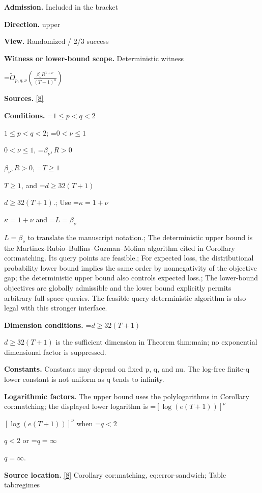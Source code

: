 \documentclass[10pt,a4paper]{article}
\newcommand{\AtlasMath}[1]{\par\begingroup\centering\setbox0=\hbox{$\displaystyle #1$}\ifdim\wd0>1.4\linewidth\typeout{ATLAS WIDE FORMULA: \the\wd0}\fi\ifdim\wd0>\linewidth\resizebox{\linewidth}{!}{\box0}\else\box0\fi\par\endgroup}
\newcommand{\AtlasInlineMath}[1]{\begingroup\setbox0=\hbox{$#1$}\ifdim\wd0>.4\linewidth\endgroup\AtlasMath{#1}\else\endgroup$#1$\fi}
\begin{document}
\textbf{Admission.} Included in the bracket



\textbf{Direction.} upper



\textbf{View.} Randomized / 2/3 success



\textbf{Witness or lower-bound scope.} Deterministic witness



\AtlasMath{\widetilde O_{p,q,\nu}\!\left(\frac{\beta_\nu R^{1+\nu}}{(T+1)^a}\right)}


\textbf{Sources.} \href{https://github.com/WU-Wendao/Colombo/blob/main/colombo_sensorium/Complexity_altas/data/sources/colombo/B1/manuscript.pdf}{[8]}



\textbf{Conditions.} \AtlasInlineMath{1\le p<q<2}; \AtlasInlineMath{0<\nu\le1}, \AtlasInlineMath{\beta_\nu,R>0}, \AtlasInlineMath{T\ge1}, and \AtlasInlineMath{d\ge32(T+1)}.; Use \AtlasInlineMath{\kappa=1+\nu} and \AtlasInlineMath{L=\beta_\nu} to translate the manuscript notation.; The deterministic upper bound is the Martinez-Rubio--Bullins--Guzman--Molina algorithm cited in Corollary cor:matching. Its query points are feasible.; For expected loss, the distributional probability lower bound implies the same order by nonnegativity of the objective gap; the deterministic upper bound also controls expected loss.; The lower-bound objectives are globally admissible and the lower bound explicitly permits arbitrary full-space queries. The feasible-query deterministic algorithm is also legal with this stronger interface.



\textbf{Dimension conditions.} \AtlasInlineMath{d\ge32(T+1)} is the sufficient dimension in Theorem thm:main; no exponential dimensional factor is suppressed.



\textbf{Constants.} Constants may depend on fixed p, q, and nu. The log-free finite-q lower constant is not uniform as q tends to infinity.



\textbf{Logarithmic factors.} The upper bound uses the polylogarithms in Corollary cor:matching; the displayed lower logarithm is \AtlasInlineMath{[\log(e(T+1))]^\nu} when \AtlasInlineMath{q<2} or \AtlasInlineMath{q=\infty}.



\textbf{Source location.} \href{https://github.com/WU-Wendao/Colombo/blob/main/colombo_sensorium/Complexity_altas/data/sources/colombo/B1/manuscript.pdf}{[8]} Corollary cor:matching, eq:error-sandwich; Table tab:regimes
\end{document}
